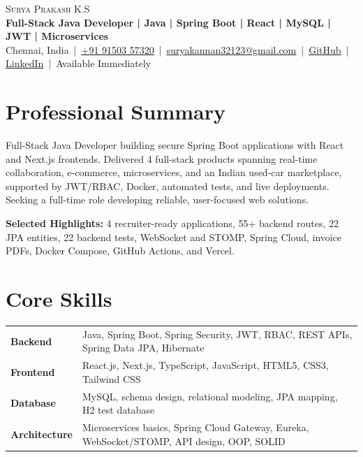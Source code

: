 \documentclass[a4paper,10pt]{article}
\newcommand{\resumeLink}[2]{\href{#1}{\textcolor{linkblue}{\underline{#2}}}}
\begin{document}
\begin{center}
  {\Huge \scshape Surya Prakash K.S} \\[3pt]
  {\small \textbf{Full-Stack Java Developer | Java | Spring Boot | React | MySQL | JWT | Microservices}} \\[2pt]
  \small
  Chennai, India \,|\, \resumeLink{tel:+919150357320}{+91 91503 57320} \,|\, 
  \resumeLink{mailto:suryakannan32123@gmail.com}{suryakannan32123@gmail.com} \,|\, 
  \resumeLink{https://github.com/SURYAPRAKASH123671}{GitHub} \,|\, 
  \resumeLink{https://www.linkedin.com/in/surya-prakash-k-s-25b177242/}{LinkedIn} \,|\, Available Immediately
\end{center}
\vspace{-4pt}

\section*{Professional Summary}
\small Full-Stack Java Developer building secure Spring Boot applications with React and Next.js frontends. Delivered 4 full-stack products spanning real-time collaboration, e-commerce, microservices, and an Indian used-car marketplace, supported by JWT/RBAC, Docker, automated tests, and live deployments. Seeking a full-time role developing reliable, user-focused web solutions.

\vspace{2pt}
\small \textbf{Selected Highlights:} 4 recruiter-ready applications, 55+ backend routes, 22 JPA entities, 22 backend tests, WebSocket and STOMP, Spring Cloud, invoice PDFs, Docker Compose, GitHub Actions, and Vercel.

\section*{Core Skills}
\small
\begin{tabularx}{\textwidth}{@{}>{\bfseries}p{1.22in}X@{}}
Backend & Java, Spring Boot, Spring Security, JWT, RBAC, REST APIs, Spring Data JPA, Hibernate \\
Frontend & React.js, Next.js, TypeScript, JavaScript, HTML5, CSS3, Tailwind CSS \\
Database & MySQL, schema design, relational modeling, JPA mapping, H2 test database \\
Architecture & Microservices basics, Spring Cloud Gateway, Eureka, WebSocket/STOMP, API design, OOP, SOLID
\end{tabularx}
\end{document}
